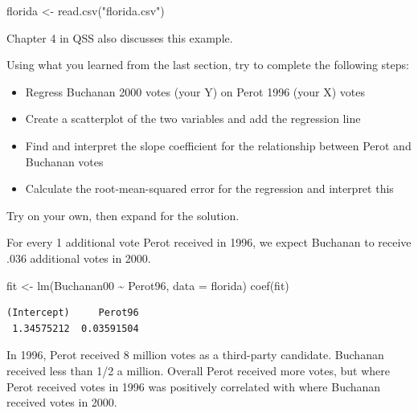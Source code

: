 \documentclass[
  letterpaper,
  DIV=11,
  numbers=noendperiod]{scrreprt}
\newenvironment{Shaded}{\begin{snugshade}}{\end{snugshade}}
\newcommand{\AttributeTok}[1]{\textcolor[rgb]{0.40,0.45,0.13}{#1}}
\newcommand{\DecValTok}[1]{\textcolor[rgb]{0.68,0.00,0.00}{#1}}
\newcommand{\FunctionTok}[1]{\textcolor[rgb]{0.28,0.35,0.67}{#1}}
\newcommand{\NormalTok}[1]{\textcolor[rgb]{0.00,0.23,0.31}{#1}}
\newcommand{\OtherTok}[1]{\textcolor[rgb]{0.00,0.23,0.31}{#1}}
\newcommand{\SpecialCharTok}[1]{\textcolor[rgb]{0.37,0.37,0.37}{#1}}
\newcommand{\StringTok}[1]{\textcolor[rgb]{0.13,0.47,0.30}{#1}}
\providecommand{\tightlist}{%
  \setlength{\itemsep}{0pt}\setlength{\parskip}{0pt}}\usepackage{longtable,booktabs,array}
\begin{document}
\begin{Shaded}
\begin{Highlighting}[]
\NormalTok{florida }\OtherTok{\textless{}{-}} \FunctionTok{read.csv}\NormalTok{(}\StringTok{"florida.csv"}\NormalTok{)}
\end{Highlighting}
\end{Shaded}

Chapter 4 in QSS also discusses this example.

Using what you learned from the last section, try to complete the
following steps:

\begin{itemize}
\tightlist
\item
  Regress Buchanan 2000 votes (your Y) on Perot 1996 (your X) votes
\item
  Create a scatterplot of the two variables and add the regression line
\item
  Find and interpret the slope coefficient for the relationship between
  Perot and Buchanan votes
\item
  Calculate the root-mean-squared error for the regression and interpret
  this
\end{itemize}

Try on your own, then expand for the solution.

For every 1 additional vote Perot received in 1996, we expect Buchanan
to receive .036 additional votes in 2000.

\begin{Shaded}
\begin{Highlighting}[]
\NormalTok{fit }\OtherTok{\textless{}{-}} \FunctionTok{lm}\NormalTok{(Buchanan00 }\SpecialCharTok{\textasciitilde{}}\NormalTok{ Perot96, }\AttributeTok{data =}\NormalTok{ florida)}
\FunctionTok{coef}\NormalTok{(fit)}
\end{Highlighting}
\end{Shaded}

\begin{verbatim}
(Intercept)     Perot96 
 1.34575212  0.03591504 
\end{verbatim}

In 1996, Perot received 8 million votes as a third-party candidate.
Buchanan received less than 1/2 a million. Overall Perot received more
votes, but where Perot received votes in 1996 was positively correlated
with where Buchanan received votes in 2000.

\begin{Shaded}
\end{Shaded}
\end{document}
